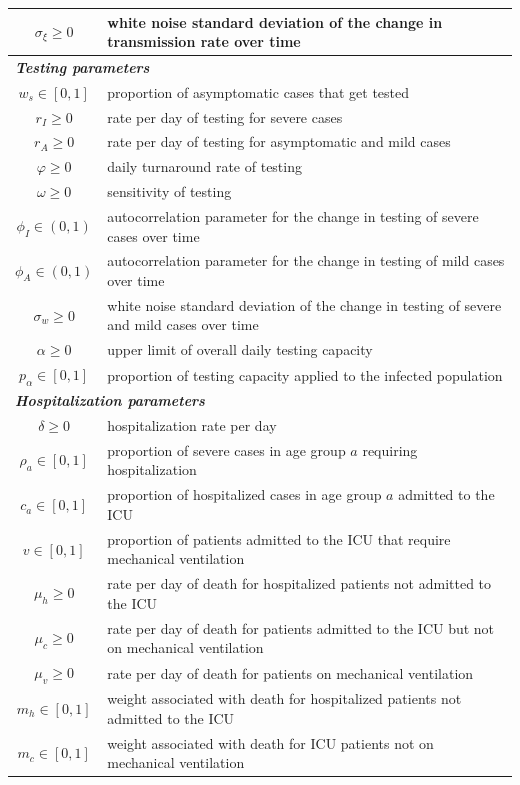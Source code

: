 \documentclass{article}
\begin{document}
\begin{table}[hp!]
\begin{center}
\begin{tabular}{|c|l|}
$\sigma_\xi \ge 0$ & white noise standard deviation of the change in transmission rate over time \\
\hline
\multicolumn{2}{|l|}{\textbf{\emph{Testing parameters}}} \\
\hline
$w_s \in [0,1]$ & proportion of asymptomatic cases that get tested \\
$r_I \ge 0$ & rate per day of testing for severe cases \\
$r_A \ge 0$ & rate per day of testing for asymptomatic and mild cases \\
$\varphi \ge 0$ & daily turnaround rate of testing \\
$\omega \ge 0$ & sensitivity of testing \\
$\phi_I \in (0,1)$ & autocorrelation parameter for the change in testing of severe cases over time \\
$\phi_A \in (0,1)$ & autocorrelation parameter for the change in testing of mild cases over time \\
$\sigma_w \ge 0$ & white noise standard deviation of the change in testing of severe and mild cases over time \\
$\alpha \ge 0$ & upper limit of overall daily testing capacity \\
$p_\alpha \in [0,1]$ & proportion of testing capacity applied to the infected population \\
\hline
\multicolumn{2}{|l|}{\textbf{\emph{Hospitalization parameters}}} \\
\hline
$\delta \ge 0$ & hospitalization rate per day \\
$\rho_a \in [0,1]$ & proportion of severe cases in age group $a$ requiring hospitalization \\
$c_a \in [0,1]$ & proportion of hospitalized cases in age group $a$ admitted to the ICU \\
$v \in [0,1]$ & proportion of patients admitted to the ICU that require mechanical ventilation \\
$\mu_h \ge 0$ & rate per day of death for hospitalized patients not admitted to the ICU \\
$\mu_c \ge 0$ & rate per day of death for patients admitted to the ICU but not on mechanical ventilation \\
$\mu_v \ge 0$ & rate per day of death for patients on mechanical ventilation \\
$m_h \in [0,1]$ & weight associated with death for hospitalized patients not admitted to the ICU \\
$m_c \in [0,1]$ & weight associated with death for ICU patients not on mechanical ventilation \\

\end{tabular}
\end{center}
\end{table}
\end{document}
